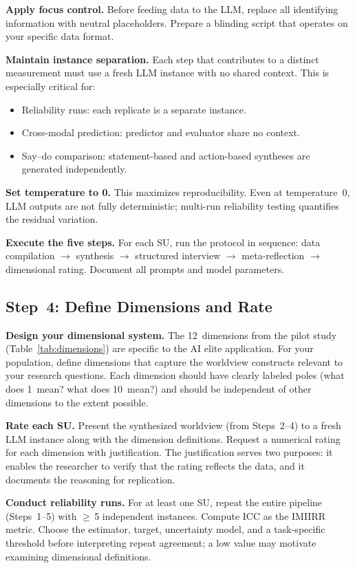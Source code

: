 \documentclass[11pt,a4paper]{article}
\begin{document}
\textbf{Apply focus control.} Before feeding data to the LLM, replace all identifying information with neutral placeholders. Prepare a blinding script that operates on your specific data format.

\textbf{Maintain instance separation.} Each step that contributes to a distinct measurement must use a fresh LLM instance with no shared context. This is especially critical for:
\begin{itemize}[nosep]
  \item Reliability runs: each replicate is a separate instance.
  \item Cross-modal prediction: predictor and evaluator share no context.
  \item Say--do comparison: statement-based and action-based syntheses are generated independently.
\end{itemize}

\textbf{Set temperature to 0.} This maximizes reproducibility. Even at temperature~0, LLM outputs are not fully deterministic; multi-run reliability testing quantifies the residual variation.

\textbf{Execute the five steps.} For each SU, run the protocol in sequence: data compilation $\to$ synthesis $\to$ structured interview $\to$ meta-reflection $\to$ dimensional rating. Document all prompts and model parameters.

\subsection{Step~4: Define Dimensions and Rate}
\label{sec:app:step4}

\textbf{Design your dimensional system.} The 12~dimensions from the pilot study (Table~\ref{tab:dimensions}) are specific to the AI elite application. For your population, define dimensions that capture the worldview constructs relevant to your research questions. Each dimension should have clearly labeled poles (what does 1~mean? what does 10~mean?) and should be independent of other dimensions to the extent possible.

\textbf{Rate each SU.} Present the synthesized worldview (from Steps~2--4) to a fresh LLM instance along with the dimension definitions. Request a numerical rating for each dimension with justification. The justification serves two purposes: it enables the researcher to verify that the rating reflects the data, and it documents the reasoning for replication.

\textbf{Conduct reliability runs.} For at least one SU, repeat the entire pipeline (Steps~1--5) with $\geq$\,5 independent instances. Compute ICC as the IMIIRR metric. Choose the estimator, target, uncertainty model, and a task-specific threshold before interpreting repeat agreement; a low value may motivate examining dimensional definitions.
\end{document}

